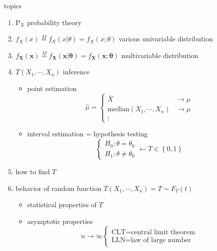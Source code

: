 \documentclass[
]{book}
\providecommand{\tightlist}{%
  \setlength{\itemsep}{0pt}\setlength{\parskip}{0pt}}
\theoremstyle{definition}
\theoremstyle{definition}
\theoremstyle{definition}
\theoremstyle{definition}
\theoremstyle{remark}
\begin{document}
topics

\begin{enumerate}
\def\labelenumi{\arabic{enumi}.}
\tightlist
\item
  \(\mathrm{P}_{{\scriptscriptstyle X}}\) probability theory
\item
  \(f_{{\scriptscriptstyle X}}\left(x\right)\overset{M}{=}f_{{\scriptscriptstyle X}}\left(x|\theta\right)=f_{{\scriptscriptstyle X}}\left(x;\theta\right)\) various univariable distribution
\item
  \(f_{\boldsymbol{{\scriptscriptstyle X}}}\left(\boldsymbol{x}\right)\overset{M}{=}f_{\boldsymbol{{\scriptscriptstyle X}}}\left(\boldsymbol{x}|\boldsymbol{\theta}\right)=f_{\boldsymbol{{\scriptscriptstyle X}}}\left(\boldsymbol{x};\boldsymbol{\theta}\right)\) multivariable distribution
\item
  \(T\left(X_{{\scriptscriptstyle 1}},\cdots,X_{{\scriptscriptstyle n}}\right)\) inference

  \begin{itemize}
  \tightlist
  \item
    point estimation
    \[
      \widehat{\mu}=\begin{cases}
      \overline{X} & \rightarrow\mu\\
      \mathrm{median}\left(X_{{\scriptscriptstyle 1}},\cdots,X_{{\scriptscriptstyle n}}\right) & \rightarrow\mu\\
      \vdots
      \end{cases}
    \]
  \item
    interval estimation = hypothesis testing
    \[
      \begin{cases}
      H_{{\scriptscriptstyle 0}}:\theta=\theta_{{\scriptscriptstyle 0}}\\
      H_{{\scriptscriptstyle 1}}:\theta\ne\theta_{{\scriptscriptstyle 0}}
      \end{cases}\leftarrow T\in\left\{ 0,1\right\} 
    \]
  \end{itemize}
\item
  how to find \(T\)
\item
  behavior of random function \(T\left(X_{{\scriptscriptstyle 1}},\cdots,X_{{\scriptscriptstyle n}}\right)=T\sim F_{{\scriptscriptstyle T}}\left(t\right)\)

  \begin{itemize}
  \tightlist
  \item
    statistical properties of \(T\)
  \item
    asymptotic properties
    \[
      n\rightarrow\infty\begin{cases}
      \text{CLT}=\text{central limit theorem}\\
      \text{LLN}=\text{law of large number}
      \end{cases}
    \]
  \end{itemize}
\end{enumerate}
\end{document}
